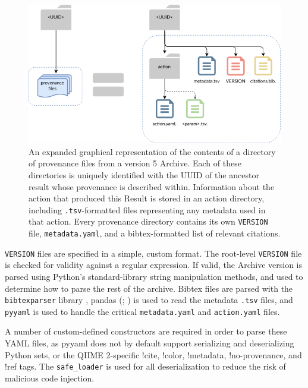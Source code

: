 \begin{figure}[htp]
\centering
\includegraphics[width=\textwidth]{figures/prov_files.png}
\caption[Diagram of the provenance file directories in a QIIME 2 Archive]%
{An expanded graphical representation of the contents of a directory of
provenance files from a version 5 Archive. Each of these directories is uniquely
identified with the UUID of the ancestor result whose provenance is described
within. Information about the action that produced this Result is stored in an
action directory, including \texttt{.tsv}-formatted files representing any metadata used
in that action. Every provenance directory contains its own \texttt{VERSION} file,
\texttt{metadata.yaml}, and a bibtex-formatted list of relevant citations.}
\label{fig:provenance_files}
\end{figure}
\texttt{VERSION} files are specified in a simple, custom format. The root-level \texttt{VERSION}
file is checked for validity against a regular expression. If valid, the Archive
version is parsed using Python’s standard-library string manipulation methods,
and used to determine how to parse the rest of the archive. Bibtex files are
parsed with the \texttt{bibtexparser} library \parencite{boulogne_bibtexparser_nodate},
pandas (\cite{reback_pandas-devpandas_2020}; \cite{mckinney_data_2010}) is used to read the
metadata \texttt{.tsv} files, and \texttt{pyyaml} is used to handle the critical \texttt{metadata.yaml} and
\texttt{action.yaml} files.

A number of custom-defined constructors are required in order to parse these
YAML files, as pyyaml does not by default support serializing and deserializing
Python sets, or the QIIME 2-specific !cite, !color, !metadata, !no-provenance,
and !ref tags. The \texttt{safe\_loader} is used for all deserialization to reduce the
risk of malicious code injection.

